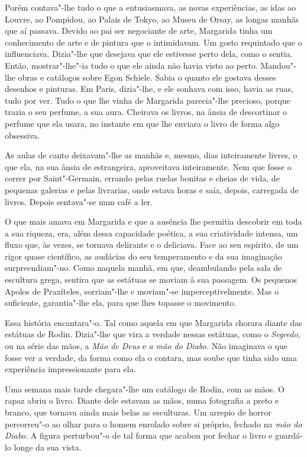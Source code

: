 Porém contava"-lhe tudo o que a entusiasmava, as novas experiências, as
idas ao Louvre, ao Pompidou, ao Palais de Tokyo, ao Museu de Orsay, as
longas manhãs que aí passava. Devido ao pai ser negociante de arte,
Margarida tinha um conhecimento de arte e de pintura que o intimidavam.
Um gosto requintado que o influenciava. Dizia"-lhe que desejava que ele
estivesse perto dela, como o sentia. Então, mostrar"-lhe"-ia tudo o que
ele ainda não havia visto ao perto. Mandou"-lhe obras e catálogos sobre
Egon Schiele. Sabia o quanto ele gostava desses desenhos e pinturas. Em
Paris, dizia"-lhe, e ele sonhava com isso, havia as ruas, tudo por ver.
Tudo o que lhe vinha de Margarida parecia"-lhe precioso, porque trazia o
seu perfume, a sua aura. Cheirava os livros, na ânsia de descortinar o
perfume que ela usara, no instante em que lhe enviara o livro de forma
algo obsessiva.

As aulas de canto deixavam"-lhe as manhãs e, mesmo, dias inteiramente
livres, o que ela, na sua ânsia de estrangeira, aproveitava
inteiramente. Nem que fosse o correr por Saint"-Germain, errando pelas
ruelas bonitas e cheias de vida, de pequenas galerias e pelas livrarias,
onde estava horas e saía, depois, carregada de livros. Depois sentava"-se
num café a ler.

O que mais amava em Margarida e que a ausência lhe permitia descobrir em
toda a sua riqueza, era, além dessa capacidade poética, a sua
criatividade intensa, um fluxo que, às vezes, se tornava delirante e o
deliciava. Face ao seu espírito, de um rigor quase científico, as
audácias do seu temperamento e da sua imaginação surpreendiam"-no. Como
naquela manhã, em que, deambulando pela sala de escultura grega, sentira
que as estátuas se moviam à sua passagem. Os pequenos Apolos de
Praxíteles, sorriam"-lhe e moviam"-se imperceptivelmente. Mas o
suficiente, garantia"-lhe ela, para que lhes topasse o movimento.

Essa história encantara"-o. Tal como aquela em que Margarida chorara
diante das estátuas de Rodin. Dizia"-lhe que vira a verdade nessas
estátuas, como o \emph{Segredo, }ou na série das mãos, a \emph{Mão de
Deus }e\emph{ a mão do Diabo.} Não imaginava o que fosse ver a verdade,
da forma como ela o contara, mas soube que tinha sido uma experiência
impressionante para ela.

Uma semana mais tarde chegara"-lhe um catálogo de Rodin, com as mãos. O
rapaz abriu o livro. Diante dele estavam as mãos, numa fotografia a
preto e branco, que tornava ainda mais belas as esculturas. Um arrepio
de horror percorreu"-o ao olhar para o homem enrolado sobre si próprio,
fechado na \emph{mão do Diabo.} A figura perturbou"-o de tal forma que
acabou por fechar o livro e guardá-lo longe da sua vista.

